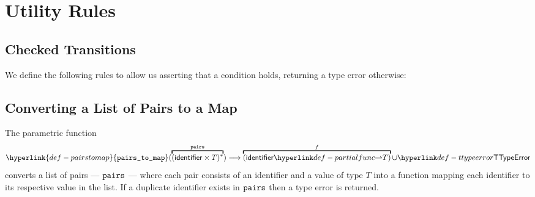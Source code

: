 \documentclass{book}
\newcommand\pairstomap[0]{\hyperlink{def-pairstomap}{\texttt{pairs\_to\_map}}}
\begin{document}
\chapter{Utility Rules}

\section{Checked Transitions}
\hypertarget{def-checktrans}{}
We define the following rules to allow us asserting that a condition holds,
returning a type error otherwise:

\hypertarget{def-pairstomap}{}
\section{Converting a List of Pairs to a Map \label{sec:PairsToMap}}
The parametric function
\[
  \pairstomap(\overname{(\identifier\times T)^*}{\pairs}) \aslto \overname{(\identifier\partialto T)}{f} \cup \TTypeError
\]
converts a list of pairs --- $\texttt{pairs}$ --- where each pair consists of an identifier and a value
of type $T$ into a function mapping each identifier to its respective value in the list.
If a duplicate identifier exists in $\texttt{pairs}$ then a type error is returned.
\end{document}
